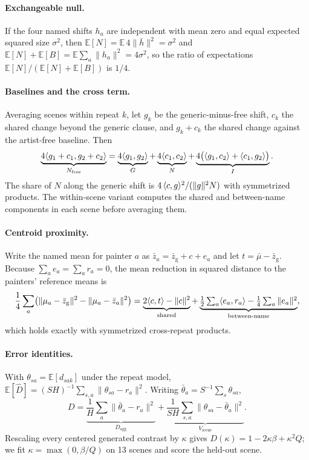 \paragraph{Exchangeable null.} If the four named shifts $h_a$ are independent with mean zero and
equal expected squared size $\sigma^2$, then $\mathbb E[N]=\mathbb E\,4\|\bar h\|^2=\sigma^2$ and
$\mathbb E[N]+\mathbb E[B]=\mathbb E\sum_a\|h_a\|^2=4\sigma^2$, so the ratio of expectations
$\mathbb E[N]/(\mathbb E[N]+\mathbb E[B])$ is $1/4$.

\paragraph{Baselines and the cross term.} Averaging scenes within repeat $k$, let $g_k$ be the
generic-minus-free shift, $c_k$ the shared change beyond the generic clause, and $g_k+c_k$ the
shared change against the artist-free baseline. Then
\begin{equation}
\underbrace{4\langle g_1+c_1,g_2+c_2\rangle}_{N_{\mathrm{free}}}=\underbrace{4\langle g_1,g_2\rangle}_{G}
+\underbrace{4\langle c_1,c_2\rangle}_{N}
+\underbrace{4\bigl(\langle g_1,c_2\rangle+\langle c_1,g_2\rangle\bigr)}_{I}.
\end{equation}
The share of $N$ along the generic shift is $4\,\langle c,g\rangle^2/(\|g\|^2N)$ with symmetrized
products. The within-scene variant computes the shared and between-name components in each
scene before averaging them.

\paragraph{Centroid proximity.} Write the named mean for painter $a$ as $\bar z_a=\bar
z_{\mathrm{g}}+c+e_a$ and let $t=\bar\mu-\bar z_{\mathrm{g}}$. Because $\sum_ae_a=\sum_ar_a=0$,
the mean reduction in squared distance to the painters' reference means is
\begin{equation}
\frac14\sum_a\bigl(\|\mu_a-\bar z_{\mathrm{g}}\|^2-\|\mu_a-\bar z_a\|^2\bigr)
=\underbrace{2\langle c,t\rangle-\|c\|^2}_{\text{shared}}
+\underbrace{\tfrac12\textstyle\sum_a\langle e_a,r_a\rangle-\tfrac14\sum_a\|e_a\|^2}_{\text{between-name}},
\end{equation}
which holds exactly with symmetrized cross-repeat products.

\paragraph{Error identities.} With $\theta_{sa}=\mathbb E[d_{sak}]$ under the repeat model,
$\mathbb E[\widehat D]=(SH)^{-1}\sum_{s,a}\|\theta_{sa}-r_a\|^2$. Writing
$\bar\theta_a=S^{-1}\sum_s\theta_{sa}$,
\begin{equation}
D=\underbrace{\frac1H\sum_a\|\bar\theta_a-r_a\|^2}_{D_{\mathrm{agg}}}
+\underbrace{\frac{1}{SH}\sum_{s,a}\|\theta_{sa}-\bar\theta_a\|^2}_{V_{\mathrm{scene}}}.
\end{equation}
Rescaling every centered generated contrast by $\kappa$ gives $D(\kappa)=1-2\kappa\beta+\kappa^2Q$;
we fit $\kappa=\max(0,\beta/Q)$ on 13 scenes and score the held-out scene.

